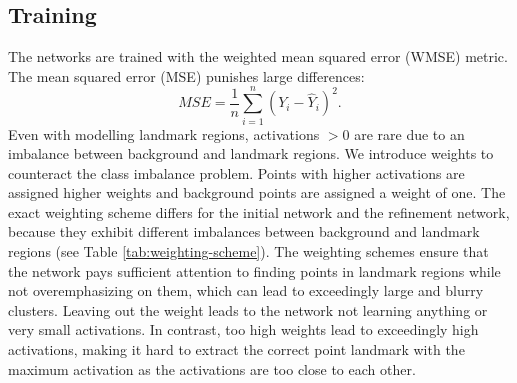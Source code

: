 \documentclass[class=article, crop=false]{standalone}
\begin{document}
\subsection{Training}
The networks are trained with the weighted mean squared error (WMSE) metric. The mean squared error (MSE) punishes large differences:
\begin{equation}
    MSE = \frac{1}{n}\sum^n_{i=1} (Y_i - \hat{Y}_i)^2.
\end{equation}
Even with modelling landmark regions, activations $> 0$ are rare due to an imbalance between background and landmark regions. We introduce weights to counteract the class imbalance problem. Points with higher activations are assigned higher weights and background points are assigned a weight of one. The exact weighting scheme differs for the initial network and the refinement network, because they exhibit different imbalances between background and landmark regions (see Table \ref{tab:weighting-scheme}). The weighting schemes ensure that the network pays sufficient attention to finding points in landmark regions while not overemphasizing on them, which can lead to exceedingly large and blurry clusters. Leaving out the weight leads to the network not learning anything or very small activations. In contrast, too high weights lead to exceedingly high activations, making it hard to extract the correct point landmark with the maximum activation as the activations are too close to each other.
\end{document}
